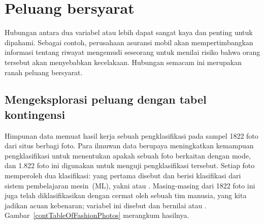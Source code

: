 {}




\section{Peluang bersyarat}
\label{conditionalProbabilitySection}

Hubungan antara dua variabel atau lebih dapat sangat kaya
dan penting untuk dipahami.
Sebagai contoh, perusahaan asuransi mobil akan mempertimbangkan
informasi tentang riwayat mengemudi seseorang untuk menilai
risiko bahwa orang tersebut akan menyebabkan kecelakaan.
Hubungan semacam ini merupakan ranah
peluang bersyarat.


\subsection{Mengeksplorasi peluang dengan tabel kontingensi}


\newcommand{\fashN}{1822}
\newcommand{\fashYY}{197}
\newcommand{\fashYN}{22}
\newcommand{\fashYA}{219}
\newcommand{\fashNY}{112}
\newcommand{\fashNN}{1491}
\newcommand{\fashNA}{1603}
\newcommand{\fashAY}{309}
\newcommand{\fashAN}{1513}
\newcommand{\fashAA}{\fashN{}}
\newcommand{\fashCYPY}{0.96}
\newcommand{\fashCYPN}{0.04}
\newcommand{\fashCNPY}{0.07}
\newcommand{\fashCNPN}{0.93}

Himpunan data  memuat hasil kerja
sebuah pengklasifikasi pada sampel \fashN{} foto dari situs berbagi foto.
Para ilmuwan data berupaya meningkatkan kemampuan pengklasifikasi
untuk menentukan apakah sebuah foto berkaitan dengan mode, dan 1.822 foto ini
digunakan untuk menguji pengklasifikasi tersebut.
Setiap foto memperoleh dua klasifikasi:
yang pertama disebut  dan berisi
klasifikasi dari sistem pembelajaran
mesin~(ML), yakni
 atau .
Masing-masing dari \fashN{} foto ini juga telah diklasifikasikan dengan cermat
oleh sebuah tim manusia, yang kita jadikan acuan kebenaran;
variabel ini disebut  dan bernilai
 atau .
Gambar~\ref{contTableOfFashionPhotos} merangkum hasilnya.

